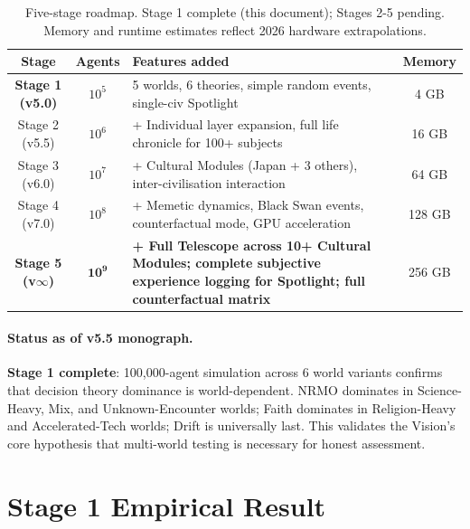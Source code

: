 \begin{table}[ht]
\centering
\small
\begin{tabularx}{\linewidth}{ccXc}
\toprule
\textbf{Stage} & \textbf{Agents} & \textbf{Features added} & \textbf{Memory} \\
\midrule
\textbf{Stage 1 (v5.0)} & $10^5$ & 5 worlds, 6 theories, simple
random events, single-civ Spotlight & 4 GB \\
Stage 2 (v5.5) & $10^6$ & + Individual layer expansion, full life
chronicle for 100+ subjects & 16 GB \\
Stage 3 (v6.0) & $10^7$ & + Cultural Modules (Japan + 3 others),
inter-civilisation interaction & 64 GB \\
Stage 4 (v7.0) & $10^8$ & + Memetic dynamics, Black Swan events,
counterfactual mode, GPU acceleration & 128 GB \\
\textbf{Stage 5 (v$\infty$)} & $\boldsymbol{10^9}$ & \textbf{+ Full
Telescope across 10+ Cultural Modules; complete subjective experience
logging for Spotlight; full counterfactual matrix} & 256 GB \\
\bottomrule
\end{tabularx}
\caption[Implementation roadmap]{Five-stage roadmap. Stage 1 complete
(this document); Stages 2-5 pending. Memory and runtime estimates
reflect 2026 hardware extrapolations.}
\label{tab:vision-roadmap}
\end{table}

\paragraph{Status as of v5.5 monograph.}
\textbf{Stage 1 complete}: 100,000-agent simulation across 6 world
variants confirms that decision theory dominance is world-dependent.
NRMO dominates in Science-Heavy, Mix, and Unknown-Encounter worlds;
Faith dominates in Religion-Heavy and Accelerated-Tech worlds; Drift is
universally last. This validates the Vision's core hypothesis that
multi-world testing is necessary for honest assessment.

\section{Stage 1 Empirical Result}
\label{sec:vision-stage1-result}

